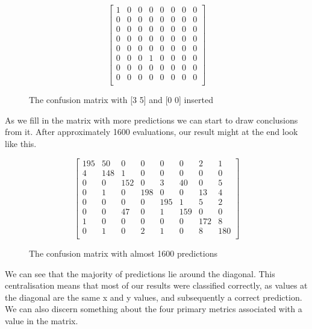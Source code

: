 \begin{figure}
    \centering
    \[
    \begin{bmatrix}
     1 & 0 &  0 &  0 &  0 &  0 &  0 &  0\\
     0 & 0 &  0 &  0 &  0 &  0 &  0 &  0\\
     0 & 0 &  0 &  0 &  0 &  0 &  0 &  0\\
     0 & 0 &  0 &  0 &  0 &  0 &  0 &  0\\
     0 & 0 &  0 &  0 &  0 &  0 &  0 &  0\\
     0 & 0 &  0 &  1 &  0 &  0 &  0 &  0\\
     0 & 0 &  0 &  0 &  0 &  0 &  0 &  0\\
     0 & 0 &  0 &  0 &  0 &  0 &  0 &  0\\
    \end{bmatrix}
    \]
    \caption{The confusion matrix with [3 5] and [0 0] inserted }
    \label{mat:nonemptyCM}
\end{figure}

As we fill in the matrix with more predictions we can start to draw conclusions from it. After approximately 1600 evaluations, our result might at the end look like this.
\begin{figure}
    \centering
    \[
    \begin{bmatrix}
     195 & 50 &  0 &  0 &  0 &  0 &  2  & 1\\
       4 & 148&  1 &  0 &  0 &  0 &  0  & 0\\
       0 &  0 & 152&  0 &  3 & 40 &  0  & 5\\
       0 &  1 &  0 &198 &  0 &  0 & 13  & 4\\
       0 &  0 &  0 & 0  &195 &  1 &  5  & 2\\
       0 &  0 & 47 & 0  &  1 &159 &  0  & 0\\
       1 &  0 &  0 & 0  &  0 &  0 & 172 &  8\\
       0 &  1 &  0 & 2  &  1 &  0 &  8  & 180\\
    \end{bmatrix}
    \]
    \caption{The confusion matrix with  almost 1600 predictions}
    \label{mat:FullCM}
\end{figure}
We can see that the majority of predictions lie around the diagonal. This centralisation means that most of our results were classified correctly, as values at the diagonal are the same x and y values, and subsequently a correct prediction. 
We can also discern something about the four primary metrics associated with a value in the matrix.\\

